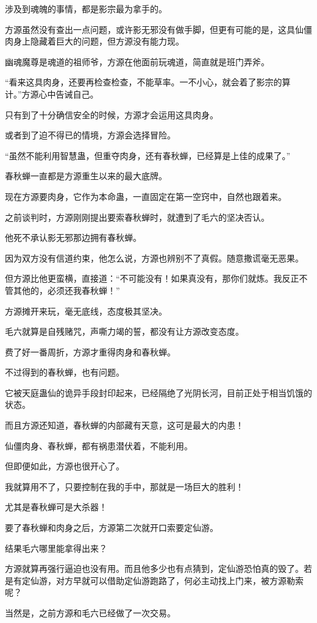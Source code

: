 \begin{this_body}
涉及到魂魄的事情，都是影宗最为拿手的。

方源虽然没有查出一点问题，或许影无邪没有做手脚，但更有可能的是，这具仙僵肉身上隐藏着巨大的问题，但方源没有能力现。

幽魂魔尊是魂道的祖师爷，方源在他面前玩魂道，简直就是班门弄斧。

“看来这具肉身，还要再检查检查，不能草率。一不小心，就会着了影宗的算计。”方源心中告诫自己。

只有到了十分确信安全的时候，方源才会运用这具肉身。

或者到了迫不得已的情境，方源会选择冒险。

“虽然不能利用智慧蛊，但重夺肉身，还有春秋蝉，已经算是上佳的成果了。”

春秋蝉一直都是方源重生以来的最大底牌。

现在方源要肉身，它作为本命蛊，一直固定在第一空窍中，自然也跟着来。

之前谈判时，方源刚刚提出要索春秋蝉时，就遭到了毛六的坚决否认。

他死不承认影无邪那边拥有春秋蝉。

因为双方没有信道约束，他怎么说，方源也辨别不了真假。随意撒谎毫无恶果。

但方源比他更蛮横，直接道：“不可能没有！如果真没有，那你们就炼。我反正不管其他的，必须还我春秋蝉！”

方源摊开来玩，毫无底线，态度极其坚决。

毛六就算是自残赌咒，声嘶力竭的誓，都没有让方源改变态度。

费了好一番周折，方源才重得肉身和春秋蝉。

不过得到的春秋蝉，也有问题。

它被天庭蛊仙的诡异手段封印起来，已经隔绝了光阴长河，目前正处于相当饥饿的状态。

而且方源还知道，春秋蝉的内部藏有天意，这可是最大的内患！

仙僵肉身、春秋蝉，都有祸患潜伏着，不能利用。

但即便如此，方源也很开心了。

我就算用不了，只要控制在我的手中，那就是一场巨大的胜利！

尤其是春秋蝉可是大杀器！

要了春秋蝉和肉身之后，方源第二次就开口索要定仙游。

结果毛六哪里能拿得出来？

方源就算再强行逼迫也没有用。而且他多少也有点猜到，定仙游恐怕真的毁了。若是有定仙游，对方早就可以借助定仙游跑路了，何必主动找上门来，被方源勒索呢？

当然是，之前方源和毛六已经做了一次交易。


\end{this_body}
